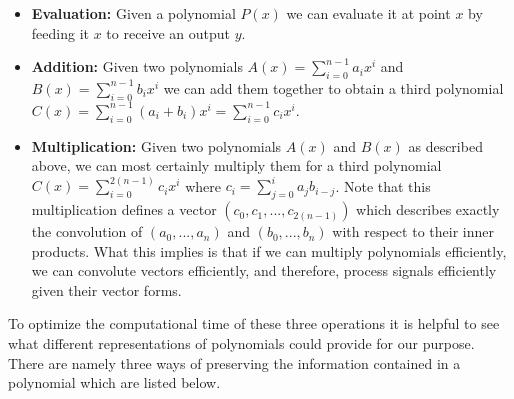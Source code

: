 \documentclass[../article.tex]{subfiles}
\begin{document}
\begin{itemize}
\item{\textbf{Evaluation:}} Given a polynomial $P(x)$ we can evaluate it at point $x$ by feeding it $x$ to receive an output $y$.

\item{\textbf{Addition:}} Given two polynomials $A(x) = \sum_{i=0}^{n-1} a_ix^i$ and $B(x) = \sum_{i=0}^{n-1} b_ix^i$ we can add them together to obtain a third polynomial $C(x) = \sum_{i=0}^{n-1} (a_i+b_i)x^i = \sum_{i=0}^{n-1} c_ix^i$.

\item {\textbf{Multiplication:}} Given two polynomials $A(x)$ and $B(x)$ as described above, we can most certainly multiply them for a third polynomial $C(x) = \sum_{i=0}^{2(n-1)} c_ix^i$ where $c_i = \sum_{j=0}^{i} a_jb_{i-j}$. Note that this multiplication defines a vector $(c_0, c_1, ..., c_{2(n-1)})$ which describes exactly the convolution of $(a_0,..., a_n)$ and $(b_0, ..., b_n)$ with respect to their inner products. What this implies is that if we can multiply polynomials efficiently, we can convolute vectors efficiently, and therefore, process signals efficiently given their vector forms.
\end{itemize}

To optimize the computational time of these three operations it is helpful to see what different representations of polynomials could provide for our purpose. There are namely three ways of preserving the information contained in a polynomial which are listed below.
\end{document}
